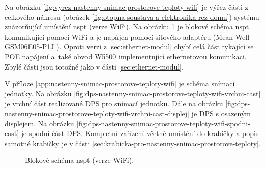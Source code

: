Na obrázku \ref{fig:vyrez-nastenny-snimac-prostorove-teploty-wifi} je výřez části z celkového nákresu (obrázek \ref{fig:otopna-soustava-a-elektronika-rez-domu}) systému znázorňující umístění \acrshort{nspt} (verze WiFi). Na obrázku \ref{fig:blokove-schema-nastenny-snimac-teploty-wifi} je blokové schéma \acrshort{nspt} komunikující pomocí WiFi a je napájen pomocí síťového adaptéru (Mean Well GSM06E05-P1J \cite{gsm06e05-p1j}). Oproti verzi z \ref{sec:ethernet-modul} chybí celá část tykající se POE napájení a~také obvod W5500 implementující ethernetovou komunikaci. Zbylé části jsou totožné jako v části \ref{sec:ethernet-modul}.

V příloze \ref{app:nastenny-snimac-prostorove-teploty-wifi} je schéma snímací jednotky. Na obrázku \ref{fig:dps-nastenny-snimac-prostorove-teploty-wifi-vrchni-cast} je vrchní část realizované DPS pro snímací jednotku. Dále na obrázku \ref{fig:dps-nastenny-snimac-prostorove-teploty-wifi-vrchni-cast-displej} je DPS s osazeným displejem. Na obrázku \ref{fig:dps-nastenny-snimac-prostorove-teploty-wifi-spodni-cast} je spodní část DPS. Kompletní zařízení včetně umístění do krabičky a popis samotné krabičky je v části \ref{sec:krabicka-pro-nastenny-snimac-prostorove-teploty}.

\begin{figure}[H]
    \centering
    \def\svgwidth{\columnwidth}
    
    \caption[]{Blokové schéma \acrshort{nspt} (verze WiFi).}
    \label{fig:blokove-schema-nastenny-snimac-teploty-wifi}
\end{figure}


